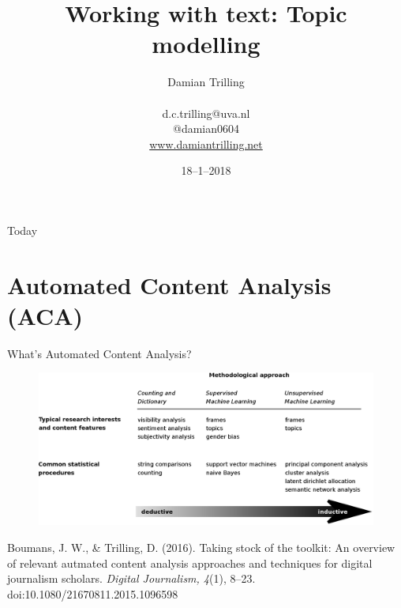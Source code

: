 \documentclass{beamer}
\begin{document}
\title{Working with text: Topic modelling}
\author[Damian Trilling]{Damian Trilling \\ ~ \\ \footnotesize{d.c.trilling@uva.nl \\@damian0604} \\ \url{www.damiantrilling.net}}
\date{18--1--2018}



\begin{frame}{}
\titlepage
\end{frame}

\begin{frame}{Today}
\tableofcontents
\end{frame}



\section[Automated Content Analysis]{Automated Content Analysis (ACA)}
\begin{frame}[plain]
	What's Automated Content Analysis?
\end{frame}


\begin{frame}[plain]
\begin{figure}
\centering
\includegraphics[width=1.0\linewidth]{boumanstrilling2016}
\label{fig:boumanstrilling2016}
\end{figure}
\tiny{Boumans, J. W., \& Trilling, D. (2016). Taking stock of the toolkit: An overview of relevant autmated content analysis approaches and techniques for digital journalism scholars. \emph{Digital Journalism, 4}(1), 8–23. doi:10.1080/21670811.2015.1096598}
\end{frame}
\end{document}
